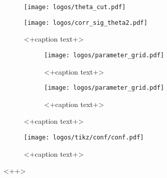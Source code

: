 \begin{figure}[H]
  \centering
  \texttt{[image: logos/theta\_cut.pdf]}
  \caption{}
  \label{fig:<+label+>}
\end{figure}

\begin{figure}[H]
  \centering
  \texttt{[image: logos/corr\_sig\_theta2.pdf]}
  \caption{<+caption text+>}
  \label{fig:<+label+>}
\end{figure}

\begin{figure}
  \begin{subfigure}[b]{0.5\textwidth}
  \texttt{[image: logos/parameter\_grid.pdf]}
  \caption{<+caption text+>}
  \label{fig:<+label+>}
\end{subfigure}
\begin{subfigure}[b]{0.5\textwidth}
  \texttt{[image: logos/parameter\_grid.pdf]}
  \caption{<+caption text+>}
  \label{fig:<+label+>}
\end{subfigure}
\end{figure}

\begin{figure}[H]
  \centering
  \texttt{[image: logos/tikz/conf/conf.pdf]}
  \caption{<+caption text+>}
  \label{fig:<+label+>}
\end{figure}<++>
